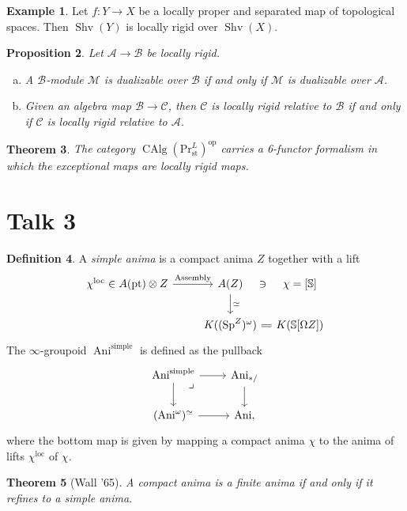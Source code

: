 \documentclass[draft]{amsart}
\renewcommand{\SS}{\mathbb{S}}
\newcommand{\cat}[1]{\mathcal{#1}}
\newcommand{\op}{\mathrm{op}}
\renewcommand{\Pr}{\mathrm{Pr}}
\DeclareMathOperator{\Anima}{Ani}
\DeclareMathOperator{\CAlg}{CAlg}
\DeclareMathOperator{\Shv}{Shv}
\DeclareMathOperator{\Sp}{Sp}
\newtheorem{thm}{Theorem}[section]
\newtheorem{prop}[thm]{Proposition}
\theoremstyle{definition}
\newtheorem{defn}[thm]{Definition}
\newtheorem{ex}[thm]{Example}
\begin{document}
\begin{ex}
Let $f\colon Y\to X$ be a locally proper and separated map of topological spaces. Then $\Shv(Y)$ is locally rigid over $\Shv(X)$.
\end{ex}

\begin{prop}
Let $\cat A\to \cat B$ be locally rigid. 
\begin{enumerate}[(a)]
\item A $\cat B$-module $\cat M$ is dualizable over $\cat B$ if and only if $\cat M$ is dualizable over $\cat A$.

\item Given an algebra map $\cat B\to \cat C$, then $\cat C$ is locally rigid relative to $\cat B$ if and only if $\cat C$ is locally rigid relative to $\cat A$.
\end{enumerate}
\end{prop}

\begin{thm}
The category $\CAlg(\Pr^L_{\mathrm{st}})^\op$ carries a 6-functor formalism in which the exceptional maps are locally rigid maps.
\end{thm}

\section{Talk 3}

\begin{defn}
A \emph{simple anima} is a compact anima $Z$ together with a lift
\[
\begin{tikzcd}
\chi^{\mathrm{loc}} \ar[r,phantom, "\in"] &[-2em] A(\mathrm{pt})\otimes Z \ar[r,"\text{Assembly}"] 
& A(Z)\ar[d,"\simeq"] &[-1.5em] \ar[l,phantom, "\ni"] \chi = {[\SS]} \\
& & K((\Sp^Z)^\omega) \ar[r,equals] & K(\SS[\Omega Z])
\end{tikzcd}
\]
The $\infty$-groupoid $\Anima^{\mathrm{simple}}$ is defined as the pullback
\[
\begin{tikzcd}
\Anima^{\mathrm{simple}} \ar[d] \ar[r] \ar[dr,phantom, very near start, "\lrcorner"] & \Anima_{*/} \ar[d] \\
(\Anima^{\omega})^{\simeq} \ar[r] & \Anima,
\end{tikzcd}
\]
where the bottom map is given by mapping a compact anima $\chi$ to the anima of lifts $\chi^{\mathrm{loc}}$ of $\chi$.
\end{defn}

\begin{thm}[Wall '65]
A compact anima is a finite anima if and only if it refines to a simple anima.
\end{thm}
\end{document}

